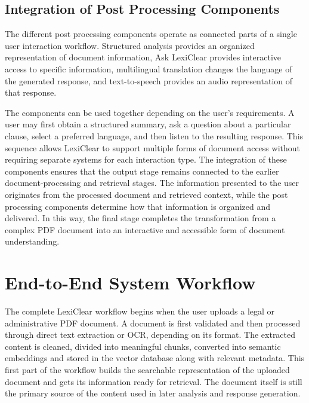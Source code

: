 \documentclass[12pt,a4paper,oneside]{report}
\begin{document}
\subsection{Integration of Post Processing Components}

The different post processing components operate as connected parts of a single user interaction workflow. Structured analysis provides an organized representation of document information, Ask LexiClear provides interactive access to specific information, multilingual translation changes the language of the generated response, and text-to-speech provides an audio representation of that response.

The components can be used together depending on the user's requirements. A user may first obtain a structured summary, ask a question about a particular clause, select a preferred language, and then listen to the resulting response. This sequence allows LexiClear to support multiple forms of document access without requiring separate systems for each interaction type. The integration of these components ensures that the output stage remains connected to the earlier document-processing and retrieval stages. The information presented to the user originates from the processed document and retrieved context, while the post processing components determine how that information is organized and delivered. In this way, the final stage completes the transformation from a complex PDF document into an interactive and accessible form of document understanding.
\section{End-to-End System Workflow}

The complete LexiClear workflow begins when the user uploads a legal or
administrative PDF document. A document is first validated and then processed through direct text extraction or OCR, depending on its format. The extracted content is cleaned, divided into meaningful chunks, converted into semantic embeddings and stored in the vector database along with relevant metadata. This first part of the workflow builds the searchable representation of the uploaded document and gets its information ready for retrieval. The document itself is still the primary source of the content used in later analysis and response generation.
\end{document}
